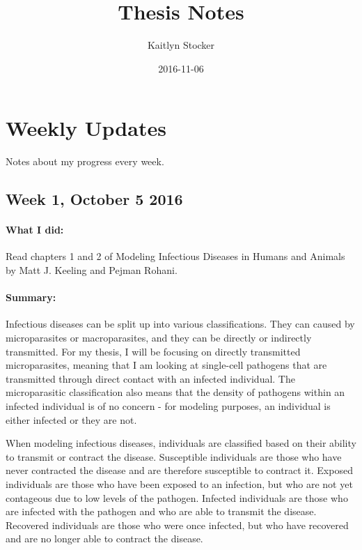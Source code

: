 \documentclass{article}
\title{Thesis Notes}
\date{2016-11-06}
\author{Kaitlyn Stocker}
\begin{document}
\maketitle
{}
\newpage
{}

\section{Weekly Updates}

Notes about my progress every week. 

\subsection{Week 1, October 5 2016}

\paragraph{What I did:}

Read chapters 1 and 2 of Modeling Infectious Diseases in Humans and Animals by Matt J. Keeling and Pejman Rohani. 

\paragraph{Summary:}

Infectious diseases can be split up into various classifications. They can caused by microparasites or macroparasites, and they can be directly or indirectly transmitted. For my thesis, I will be focusing on directly transmitted microparasites, meaning that I am looking at single-cell pathogens that are transmitted through direct contact with an infected individual. The microparasitic classification also means that the density of pathogens within an infected individual is of no concern - for modeling purposes, an individual is either infected or they are not. 

When modeling infectious diseases, individuals are classified based on their ability to transmit or contract the disease. Susceptible individuals are those who have never contracted the disease and are therefore susceptible to contract it. Exposed individuals are those who have been exposed to an infection, but who are not yet contageous due to low levels of the pathogen. Infected individuals are those who are infected with the pathogen and who are able to transmit the disease. Recovered individuals are those who were once infected, but who have recovered and are no longer able to contract the disease. 
\end{document}

